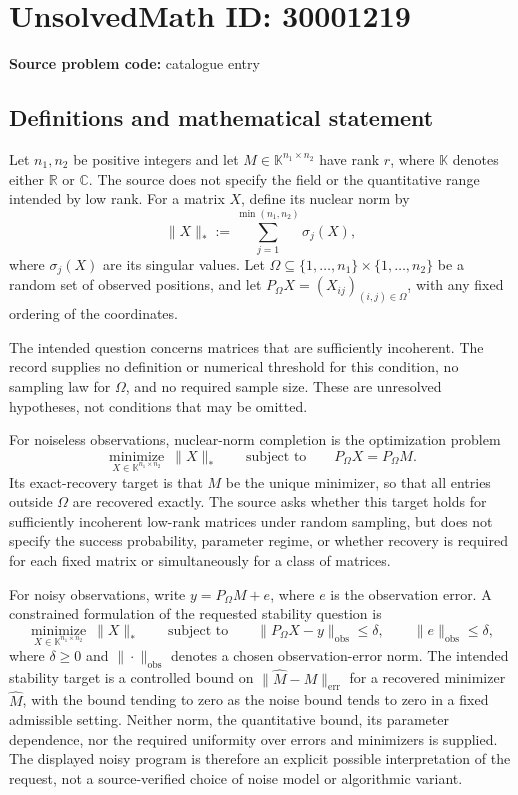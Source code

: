 \documentclass[11pt]{article}
\newcommand{\R}{\mathbb{R}}
\newcommand{\C}{\mathbb{C}}
\begin{document}
\section*{UnsolvedMath ID: 30001219}
\textbf{Source problem code:} catalogue entry
\subsection{Definitions and mathematical statement}
Let \(n_1,n_2\) be positive integers and let \(M\in\mathbb K^{n_1\times n_2}\) have rank \(r\), where \(\mathbb K\) denotes either \(\R\) or \(\C\). The source does not specify the field or the quantitative range intended by low rank. For a matrix \(X\), define its nuclear norm by
\[
\|X\|_*:=\sum_{j=1}^{\min(n_1,n_2)}\sigma_j(X),
\]
where \(\sigma_j(X)\) are its singular values. Let \(\Omega\subseteq\{1,\ldots,n_1\}\times\{1,\ldots,n_2\}\) be a random set of observed positions, and let \(P_\Omega X=(X_{ij})_{(i,j)\in\Omega}\), with any fixed ordering of the coordinates.

The intended question concerns matrices that are sufficiently incoherent. The record supplies no definition or numerical threshold for this condition, no sampling law for \(\Omega\), and no required sample size. These are unresolved hypotheses, not conditions that may be omitted.

For noiseless observations, nuclear-norm completion is the optimization problem
\[
\operatorname*{minimize}_{X\in\mathbb K^{n_1\times n_2}}\ \|X\|_*
\qquad\text{subject to}\qquad
P_\Omega X=P_\Omega M.
\]
Its exact-recovery target is that \(M\) be the unique minimizer, so that all entries outside \(\Omega\) are recovered exactly. The source asks whether this target holds for sufficiently incoherent low-rank matrices under random sampling, but does not specify the success probability, parameter regime, or whether recovery is required for each fixed matrix or simultaneously for a class of matrices.

For noisy observations, write \(y=P_\Omega M+e\), where \(e\) is the observation error. A constrained formulation of the requested stability question is
\[
\operatorname*{minimize}_{X\in\mathbb K^{n_1\times n_2}}\ \|X\|_*
\qquad\text{subject to}\qquad
\|P_\Omega X-y\|_{\mathrm{obs}}\leq\delta,
\qquad \|e\|_{\mathrm{obs}}\leq\delta,
\]
where \(\delta\geq0\) and \(\|\cdot\|_{\mathrm{obs}}\) denotes a chosen observation-error norm. The intended stability target is a controlled bound on \(\|\widehat M-M\|_{\mathrm{err}}\) for a recovered minimizer \(\widehat M\), with the bound tending to zero as the noise bound tends to zero in a fixed admissible setting. Neither norm, the quantitative bound, its parameter dependence, nor the required uniformity over errors and minimizers is supplied. The displayed noisy program is therefore an explicit possible interpretation of the request, not a source-verified choice of noise model or algorithmic variant.
\end{document}
